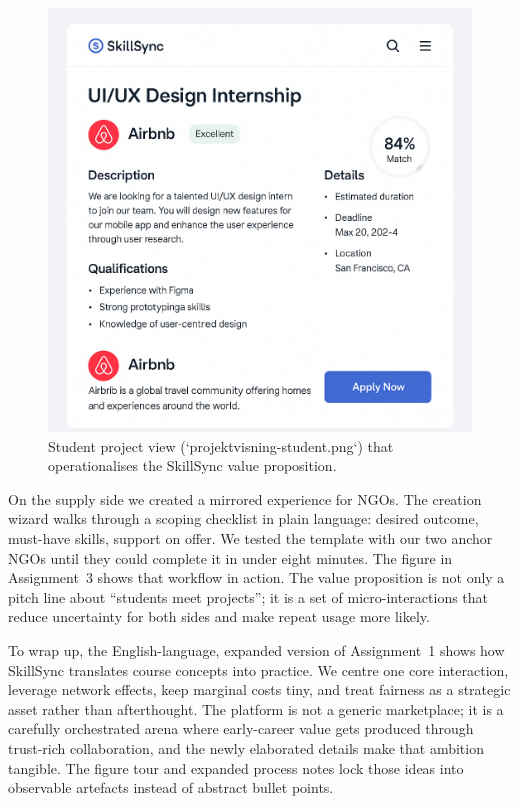 \begin{figure}[h]
  \centering
  \includegraphics[width=0.85\linewidth]{figures/opgave01/projektvisning-student.png}
  \caption{Student project view (`projektvisning-student.png`) that operationalises the SkillSync value proposition.}
  \label{fig:student-view}
\end{figure}

On the supply side we created a mirrored experience for NGOs. The creation wizard walks through a scoping checklist in plain language: desired outcome, must-have skills, support on offer. We tested the template with our two anchor NGOs until they could complete it in under eight minutes. The figure in Assignment~3 shows that workflow in action. The value proposition is not only a pitch line about ``students meet projects''; it is a set of micro-interactions that reduce uncertainty for both sides and make repeat usage more likely.

To wrap up, the English-language, expanded version of Assignment~1 shows how SkillSync translates course concepts into practice. We centre one core interaction, leverage network effects, keep marginal costs tiny, and treat fairness as a strategic asset rather than afterthought. The platform is not a generic marketplace; it is a carefully orchestrated arena where early-career value gets produced through trust-rich collaboration, and the newly elaborated details make that ambition tangible. The figure tour and expanded process notes lock those ideas into observable artefacts instead of abstract bullet points.
